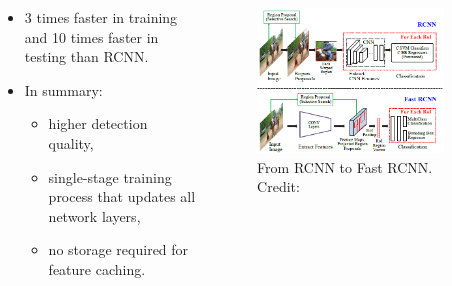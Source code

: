 \documentclass{beamer}
\begin{document}
\begin{frame}{}
	\begin{columns}
		\begin{column}{0.5\textwidth}
			\begin{itemize}
				\item 3 times faster in training and 10 times faster in testing than RCNN.
				\item In summary:
				\begin{itemize}
					\item higher detection quality,
					\item single-stage training process that updates all network layers,
					\item no storage required for feature caching.
				\end{itemize}
			\end{itemize}
		\end{column}
		\begin{column}{0.5\textwidth}
			\begin{figure}
				\centering
				\includegraphics[width=0.9\textwidth]{images/rcnn-fastrcnn.PNG}
				\caption{From RCNN to Fast RCNN.
					\hbox{\scriptsize Credit:}}
			\end{figure}
		\end{column}
	\end{columns}
\end{frame}
\end{document}
